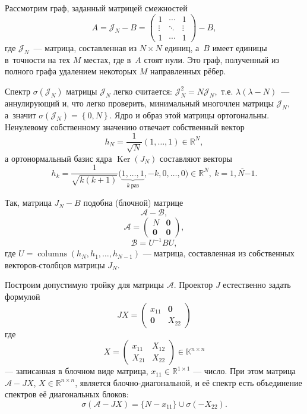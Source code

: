 Рассмотрим граф, заданный матрицей смежностей
\[ A = \mathcal{J}_N - B =
   \begin{pmatrix}1 & \cdots & 1\\ \vdots & \ddots & \vdots \\ 1 & \cdots & 1\end{pmatrix} - B,
   \]
    где \( \mathcal{J}_N \)~--- матрица, составленная из \( N{\times}N \) единиц,
    а~\( B \) имеет единицы в~точности на тех \( M \) местах,
    где в~\( A \) стоят нули.
Это граф, полученный из полного графа
    удалением некоторых \( M \) направленных рёбер.

Спектр \( \sigma\left( \mathcal{J}_N \right) \)
    матрицы \( \mathcal{J}_N \) легко считается:
    \( \mathcal{J}_N^2 = N \mathcal{J}_N, \) т.е.
    \( \lambda(\lambda - N) \)~--- аннулирующий и, что легко проверить,
    минимальный многочлен матрицы \( \mathcal{J}_N \), а~значит
    \( \sigma\left( \mathcal{J}_N \right) = \left\{ 0,N \right\}. \)
Ядро и образ этой матрицы ортогональны.
Ненулевому собственному значению
    отвечает собственный вектор
    \[
        h_N = \frac{1}{\sqrt{N}}(1,\ldots, 1)\in\mathbb{R}^N,
        \]
    а ортонормальный базис ядра \( \operatorname{Ker}(J_N) \)
    составляют векторы
    \[
        h_k = \frac{1}{\sqrt{k(k+1)}}
        \big(\underbrace{1,\ldots, 1}_{k\ \text{раз}}, -k, 0, \ldots, 0\big)
        \in\mathbb{R}^N,
        \ k=\overline{1,N{-1}}.
        \]

Так, матрица \( J_N-B \) подобна (блочной) матрице
    \[
        \mathcal{A} - \mathcal{B}, \]
    \[
        \mathcal{A} = \left(\begin{array}{c|c}
        N & \mathbf{0} \\ \hline
        \mathbf{0} & \mathbf{0}
        \end{array}\right),
        \]
    \[
        \mathcal{B} = U^{-1}B U,
        \]
    где \( U=\operatorname{columns}(h_N, h_1, \ldots, h_{N-1}) \)
    --- матрица, составленная из собственных векторов-столбцов матрицы \( J_N \).

Построим допустимую тройку для матрицы \( \mathcal{A} \).
Проектор \( J \) естественно задать формулой
    \[
        JX =
        \left(\begin{array}{c|c}
        x_{11} & \mathbf{0} \\ \hline
        \mathbf{0} & X_{22}
        \end{array}\right)
        \]
где
    \[
        X =
        \left(\begin{array}{c|c}
        x_{11} & X_{12} \\ \hline
        X_{21} & X_{22}
        \end{array}\right)\in\mathbb{K}^{n{\times}n}
        \]
        --- записанная в блочном виде матрица,
        \( x_{11}\in\mathbb{R}^{1\times 1} \) --- число.
При этом матрица \( \mathcal{A} - JX \),
    \( X\in\mathbb{R}^{n{\times}n} \),
    является блочно-диагональной,
    и её спектр есть объединение спектров её диагональных блоков:
    \[
        \sigma(\mathcal{A} - JX)
        = \{ N - x_{11} \} \cup \sigma(-X_{22}).
        \]

